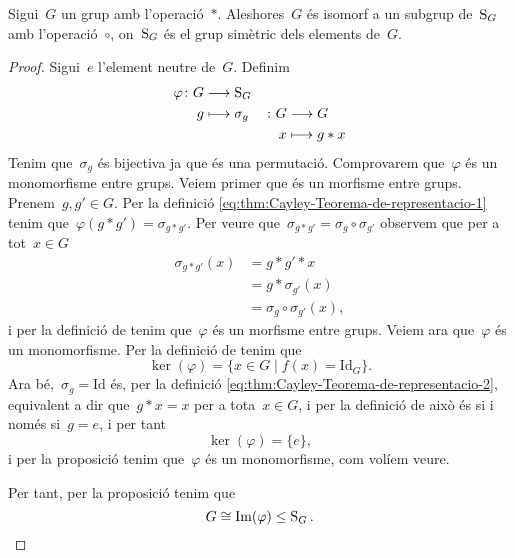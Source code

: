 \documentclass[../../main.tex]{subfiles}
\begin{document}
    \begin{theorem}
        \label{thm:Cayley-Teorema-de-representacio}
        Sigui~\(G\) un grup amb l'operació~\(\ast\).
        Aleshores~\(G\) és isomorf a un subgrup de~\(\operatorname{S}_{G}\) amb l'operació~\(\circ\), on~\(\operatorname{S}_{G}\) és el grup simètric dels elements de~\(G\).
    \end{theorem}
    \begin{proof}
        Sigui~\(e\) l'element neutre de~\(G\).
        Definim
        \begin{alignat}{2}
        \varphi\colon G&\longrightarrow\operatorname{S}_{G}&&\label{eq:thm:Cayley-Teorema-de-representacio-1}\\
        g&\longmapsto\sigma_{g}&\colon G&\longrightarrow G\label{eq:thm:Cayley-Teorema-de-representacio-2}\\
        &&x&\longmapsto g\ast x\nonumber
        \end{alignat}
        Tenim que~\(\sigma_{g}\) és bijectiva ja que és una permutació.
        Comprovarem que~\(\varphi\) és un monomorfisme entre grups.
        Veiem primer que és un morfisme entre grups.
        Prenem~\(g,g'\in G\).
        Per la definició \eqref{eq:thm:Cayley-Teorema-de-representacio-1} tenim que~\(\varphi(g\ast g')=\sigma_{g\ast g'}\).
        Per veure que~\(\sigma_{g\ast g'}=\sigma_{g}\circ\sigma_{g'}\) observem que per a tot~\(x\in G\)
        \begin{align*}
        \sigma_{g\ast g'}(x)&=g\ast g'\ast x\\
        &=g\ast\sigma_{g'}(x)\\
        &=\sigma_{g}\circ\sigma_{g'}(x),
        \end{align*}
        i per la definició de  tenim que~\(\varphi\) és un morfisme entre grups.
        Veiem ara que~\(\varphi\) és un monomorfisme.
        Per la definició de  tenim que
        \[
            \ker(\varphi)=\{x\in G\mid f(x)=\text{Id}_{G}\}.
        \]
        Ara bé,~\(\sigma_{g}=\text{Id}\) és, per la definició \eqref{eq:thm:Cayley-Teorema-de-representacio-2}, equivalent a dir que~\(g\ast x=x\) per a tota~\(x\in G\), i per la definició de  això és si i només si~\(g=e\), i per tant
        \[
            \ker(\varphi)=\{e\},
        \]
        i per la proposició  tenim que~\(\varphi\) és un monomorfisme, com volíem veure.

        Per tant, per la proposició  tenim que
        \[
            G\cong \operatorname{Im}(\varphi)\leq\operatorname{S}_{G}.\qedhere
        \]
    \end{proof}
\end{document}
